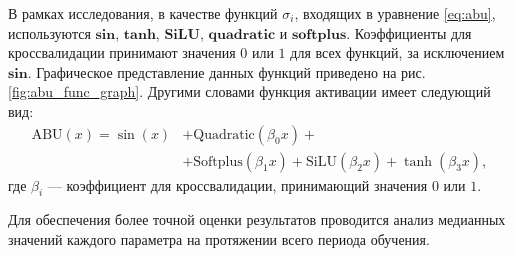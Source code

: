 В рамках исследования, в качестве функций $\sigma_i$, входящих в уравнение \eqref{eq:abu},
используются $\mathbf{sin}$, $\mathbf{tanh}$, $\mathbf{SiLU}$, $\mathbf{quadratic}$ и
$\mathbf{softplus}$. Коэффициенты для кроссвалидации принимают значения $0$ или $1$ для всех
функций, за исключением $\mathbf{sin}$. Графическое представление данных функций приведено
на рис. \ref{fig:abu_func_graph}.
Другими словами функция активации имеет следующий вид:
\begin{equation}
    \begin{split}
        \text{ABU}(x) = \sin(x) &+ \text{Quadratic}(\beta_0 x) + \\
        &+ \text{Softplus}(\beta_1 x) + \text{SiLU}(\beta_2 x) + \tanh(\beta_3 x),
    \end{split}
    \label{eq:abu_custom}
\end{equation}
где $\beta_i$ --- коэффициент для кроссвалидации,  принимающий значения $0$ или $1$.


Для обеспечения более точной оценки результатов проводится анализ медианных значений каждого
параметра на протяжении всего периода обучения.